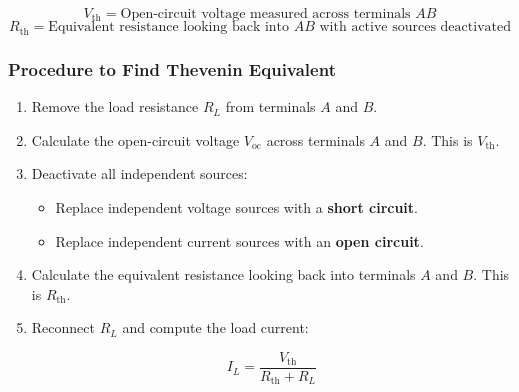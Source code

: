 \documentclass[11pt,a4paper]{article}
\begin{document}
\begin{center}
\end{center}

\begin{formulabox}
    \[ V_{\text{th}} = \text{Open-circuit voltage measured across terminals } AB \]
    \[ R_{\text{th}} = \text{Equivalent resistance looking back into } AB \text{ with active sources deactivated} \]
\end{formulabox}

\subsubsection{Procedure to Find Thevenin Equivalent}
\begin{enumerate}
    \item Remove the load resistance $R_L$ from terminals $A$ and $B$.
    \item Calculate the open-circuit voltage $V_{\text{oc}}$ across terminals $A$ and $B$. This is $V_{\text{th}}$.
    \item Deactivate all independent sources:
    \begin{itemize}
        \item Replace independent voltage sources with a \textbf{short circuit}.
        \item Replace independent current sources with an \textbf{open circuit}.
    \end{itemize}
    \item Calculate the equivalent resistance looking back into terminals $A$ and $B$. This is $R_{\text{th}}$.
    \item Reconnect $R_L$ and compute the load current:
    \begin{formulabox}
        \[ I_L = \frac{V_{\text{th}}}{R_{\text{th}} + R_L} \]
    \end{formulabox}
\end{enumerate}
\end{document}
